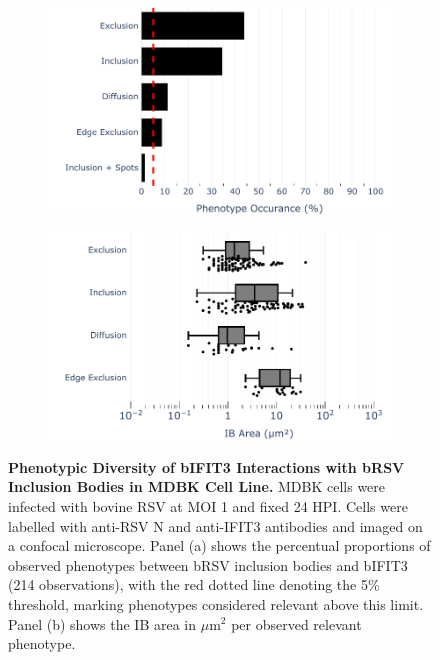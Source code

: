 \begin{figure}
    \begin{subfigure}{0.495\textwidth}
        \caption{}
        \includegraphics[width=1\linewidth]{08. Chapter 3/Figs/02. Infection/03. IFIT3/07. bar_i3_mdbk.pdf} 
    \end{subfigure}
    \begin{subfigure}{0.495\textwidth}
        \caption{}
        \includegraphics[width=1\linewidth]{08. Chapter 3/Figs/02. Infection/03. IFIT3/08. box_i3_mdbk.pdf}
    \end{subfigure}
    \caption[Phenotypic Diversity of bIFIT3 Interactions with bRSV Inclusion Bodies in MDBK Cell Line.]{\textbf{Phenotypic Diversity of bIFIT3 Interactions with bRSV Inclusion Bodies in MDBK Cell Line.} MDBK cells were infected with bovine RSV at MOI 1 and fixed 24 HPI. Cells were labelled with anti-RSV N and anti-IFIT3 antibodies and imaged on a confocal microscope. Panel (a) shows the percentual proportions of observed phenotypes between bRSV inclusion bodies and bIFIT3 (214 observations), with the red dotted line denoting the 5\% threshold, marking phenotypes considered relevant above this limit. Panel (b) shows the IB area in \(\mu \mbox{m}^2\) per observed relevant phenotype.}
    \label{fig:Phenotypic Diversity of bIFIT3 Interactions with bRSV Inclusion Bodies in MDBK Cell Line}
\end{figure}

